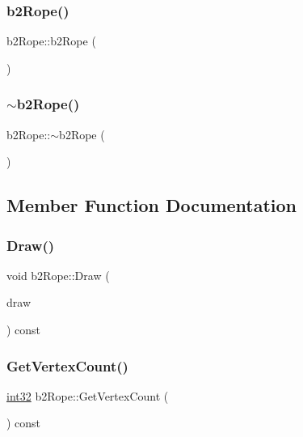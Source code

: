 \subsubsection{\texorpdfstring{b2Rope()}{b2Rope()}}
{\footnotesize\ttfamily b2\+Rope\+::b2\+Rope (\begin{DoxyParamCaption}{ }\end{DoxyParamCaption})}

\mbox{\label{classb2_rope_ae18c8d8cf4c4647ca69cfc2cba1e4146}} 
\subsubsection{\texorpdfstring{$\sim$b2Rope()}{~b2Rope()}}
{\footnotesize\ttfamily b2\+Rope\+::$\sim$b2\+Rope (\begin{DoxyParamCaption}{ }\end{DoxyParamCaption})}



\subsection{Member Function Documentation}
\mbox{\label{classb2_rope_a9545f16b4ed203890a290d58ba56255c}} 
\subsubsection{\texorpdfstring{Draw()}{Draw()}}
{\footnotesize\ttfamily void b2\+Rope\+::\+Draw (\begin{DoxyParamCaption}\item[{\mbox{\hyperlink{classb2_draw}{b2\+Draw}} $\ast$}]{draw }\end{DoxyParamCaption}) const}

\mbox{\label{classb2_rope_afdf6f7234dbf73fa83a058452e3d492a}} 
\subsubsection{\texorpdfstring{GetVertexCount()}{GetVertexCount()}}
{\footnotesize\ttfamily \mbox{\hyperlink{b2_settings_8h_a43d43196463bde49cb067f5c20ab8481}{int32}} b2\+Rope\+::\+Get\+Vertex\+Count (\begin{DoxyParamCaption}{ }\end{DoxyParamCaption}) const\hspace{0.3cm}{\ttfamily [inline]}}

